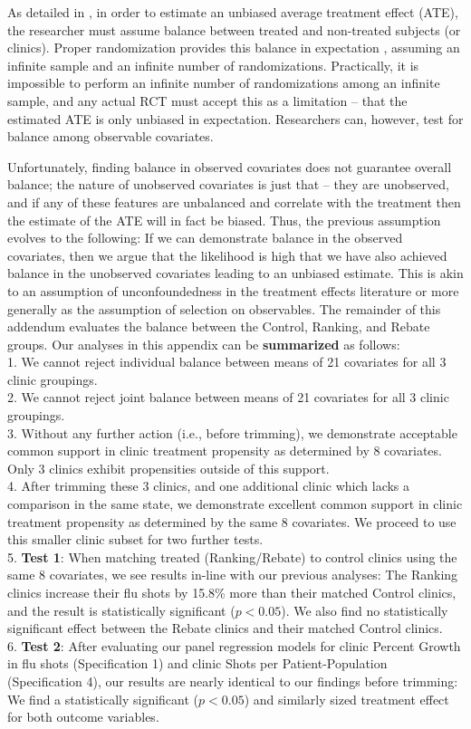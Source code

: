 As detailed in \cite{Deaton2018}, in order to estimate an unbiased average treatment effect (ATE), the researcher must assume balance between treated and non-treated subjects (or clinics). Proper randomization provides this balance in expectation \citep[p. 4]{Deaton2018}, assuming an infinite sample and an infinite number of randomizations. Practically, it is impossible to perform an infinite number of randomizations among an infinite sample, and any actual RCT must accept this as a limitation – that the estimated ATE is only unbiased in expectation. Researchers can, however, test for balance among observable covariates. 

Unfortunately, finding balance in observed covariates does not guarantee overall balance; the nature of unobserved covariates is just that – they are unobserved, and if any of these features are unbalanced and correlate with the treatment then the estimate of the ATE will in fact be biased. Thus, the previous assumption evolves to the following: If we can demonstrate balance in the observed covariates, then we argue that the likelihood is high that we have also achieved balance in the unobserved covariates leading to an unbiased estimate. This is akin to an assumption of unconfoundedness in the treatment effects literature \citep[e.g.,][]{Rubin1990} or more generally as the \cite{Heckman1985} assumption of selection on observables. The remainder of this addendum evaluates the balance between the Control, Ranking, and Rebate groups. Our analyses in this appendix can be \textbf{summarized} as follows: \\
1.	We cannot reject individual balance between means of 21 covariates for all 3 clinic groupings. \\
2.	We cannot reject joint balance between means of 21 covariates for all 3 clinic groupings.\\
3.	Without any further action (i.e., before trimming), we demonstrate acceptable common support in clinic treatment propensity as determined by 8 covariates. Only 3 clinics exhibit propensities outside of this support.\\
4.	After trimming these 3 clinics, and one additional clinic which lacks a comparison in the same state, we demonstrate excellent common support in clinic treatment propensity as determined by the same 8 covariates. We proceed to use this smaller clinic subset for two further tests.\\
5.	\textbf{Test 1}: When matching treated (Ranking/Rebate) to control clinics using the same 8 covariates, we see results in-line with our previous analyses: The Ranking clinics increase their flu shots by 15.8\% more than their matched Control clinics, and the result is statistically significant ($p < 0.05$). We also find no statistically significant effect between the Rebate clinics and their matched Control clinics.\\
6.	\textbf{Test 2}: After evaluating our panel regression models for clinic Percent Growth in flu shots (Specification 1) and clinic Shots per Patient-Population (Specification 4), our results are nearly identical to our findings before trimming: We find a statistically significant ($p < 0.05$) and similarly sized treatment effect for both outcome variables.\\

